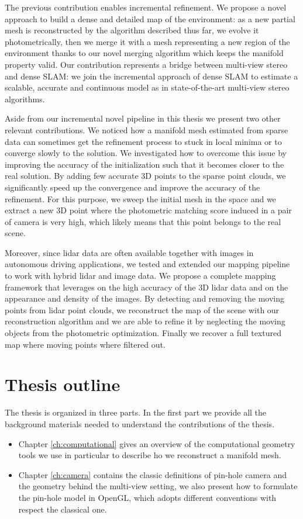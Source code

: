 The previous contribution enables incremental refinement. 
We propose a novel approach to build a dense and detailed map of the environment: as a new partial mesh is reconstructed by the algorithm described thus far, we evolve it photometrically, then we merge it with a mesh representing a new region of the environment thanks to our novel merging algorithm which keeps the manifold property valid.
Our contribution represents a bridge between multi-view stereo and 
dense SLAM: we join the incremental approach of dense SLAM to estimate a  scalable, accurate and continuous model as in state-of-the-art multi-view stereo algorithms. 

Aside from our incremental novel pipeline in this thesis we present two other relevant contributions.
We noticed how a manifold mesh estimated from sparse data can sometimes get the refinement process to stuck  in local minima or to converge slowly to the solution. 
We investigated how to overcome this issue by improving the accuracy of  the initialization such that it becomes closer to the real solution.
By adding few accurate 3D points to the sparse point clouds, we significantly speed up the convergence and improve the accuracy of the refinement.
For this purpose, we sweep the initial mesh in the space and we extract a new 3D point where the photometric matching score induced in a pair of camera is very high, which likely means that this point belongs to the real scene.

Moreover, since lidar data are often available together with images in autonomous driving applications, we tested and extended our mapping pipeline to work with hybrid lidar and image data.
We propose a complete mapping framework  that leverages on the high accuracy of the 3D lidar data and on the appearance and density of the images.
By detecting and removing the moving points from lidar point clouds, we reconstruct the map of the scene with our reconstruction algorithm and we are able to refine it by neglecting the moving objects from the photometric optimization. Finally we recover a full textured map where moving points where filtered out.



\section{Thesis outline}

The thesis is organized in three parts. 
In the first part we provide all the background materials needed to understand the contributions of the thesis.
\begin{itemize}
 \item Chapter \ref{ch:computational} gives an overview of the computational geometry tools we use in particular to describe ho we reconstruct a manifold mesh.
 \item Chapter \ref{ch:camera} contains the classic definitions of pin-hole camera and the geometry behind the  multi-view setting, we also present how to formulate the pin-hole model in OpenGL, which adopts different conventions with respect the classical one.
\end{itemize}

